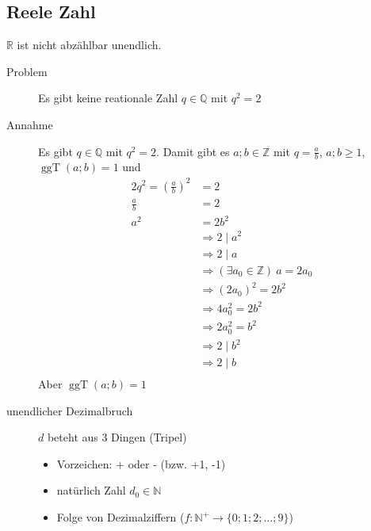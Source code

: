 \documentclass[12pt,a4paper]{article}
\DeclareMathOperator\ggt{ggT}
\begin{document}
\subsection{Reele Zahl}
$\mathbb{R}$ ist nicht abzählbar unendlich.
\begin{description}
	\item[Problem] Es gibt keine reationale Zahl $q \in \mathbb{Q}$ mit $q^2 = 2$
	\item[Annahme] Es gibt $q \in \mathbb{Q}$ mit $q^2 = 2$. Damit gibt es $a;b \in \mathbb{Z}$ mit $q = \frac{a}{b}$, $a;b \geq 1$, $\ggt(a;b) = 1$ und
		\begin{alignat*}{2}
			q^2 = \left( \frac{a}{b}\right)^2 & = 2                                                \\
			\frac{a}{b}                       & = 2                                                \\
			a^2                               & = 2b^2                                             \\
			                                  & \Rightarrow 2 \mid a^2                             \\
			                                  & \Rightarrow 2 \mid a                               \\
			                                  & \Rightarrow (\exists a_0 \in \mathbb{Z})\ a = 2a_0 \\
			                                  & \Rightarrow \left(2a_0\right)^2 = 2b^2             \\
			                                  & \Rightarrow 4a_0^2 = 2b^2                          \\
			                                  & \Rightarrow 2a_0^2 = b^2                           \\
			                                  & \Rightarrow 2 \mid b^2                             \\
			                                  & \Rightarrow 2 \mid b                               \\
		\end{alignat*}
		Aber $\ggt(a;b) = 1$
	\item[unendlicher Dezimalbruch] $d$ beteht aus 3 Dingen (Tripel)
		\begin{itemize}
			\item Vorzeichen: + oder - (bzw. +1, -1)
			\item natürlich Zahl $d_0 \in \mathbb{N}$
			\item Folge von Dezimalziffern ($f : \mathbb{N}^+ \longrightarrow \lbrace 0; 1; 2; \dots ; 9 \rbrace$)

\end{itemize}
\end{description}
\end{document}
